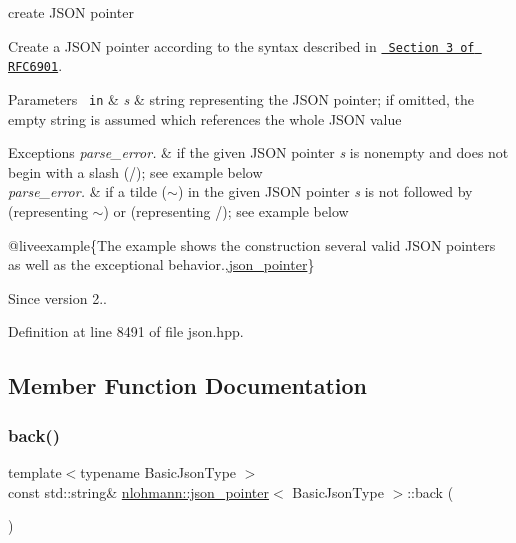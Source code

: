 create J\+S\+ON pointer 

Create a J\+S\+ON pointer according to the syntax described in \href{https://tools.ietf.org/html/rfc6901\#section-3}{\texttt{ Section 3 of R\+F\+C6901}}.


\begin{DoxyParams}[1]{Parameters}
\mbox{\texttt{ in}}  & {\em s} & string representing the J\+S\+ON pointer; if omitted, the empty string is assumed which references the whole J\+S\+ON value\\
\hline
\end{DoxyParams}

\begin{DoxyExceptions}{Exceptions}
{\em parse\+\_\+error.} & if the given J\+S\+ON pointer {\itshape s} is nonempty and does not begin with a slash ({\ttfamily /}); see example below\\
\hline
{\em parse\+\_\+error.} & if a tilde ({\ttfamily $\sim$}) in the given J\+S\+ON pointer {\itshape s} is not followed by {} (representing {\ttfamily $\sim$}) or {} (representing {\ttfamily /}); see example below\\
\hline
\end{DoxyExceptions}
@liveexample\{The example shows the construction several valid J\+S\+ON pointers as well as the exceptional behavior.,\mbox{\hyperlink{classnlohmann_1_1json__pointer}{json\+\_\+pointer}}\}

\begin{DoxySince}{Since}
version 2.. 
\end{DoxySince}


Definition at line 8491 of file json.\+hpp.



\subsection{Member Function Documentation}
\mbox{\label{classnlohmann_1_1json__pointer_a6bd5b554c10f15672135c216893eef31}} 
\subsubsection{\texorpdfstring{back()}{back()}}
{\footnotesize\ttfamily template$<$typename Basic\+Json\+Type $>$ \\
const std\+::string\& \mbox{\hyperlink{classnlohmann_1_1json__pointer}{nlohmann\+::json\+\_\+pointer}}$<$ Basic\+Json\+Type $>$\+::back (\begin{DoxyParamCaption}{ }\end{DoxyParamCaption})\hspace{0.3cm}{\ttfamily [inline]}}



